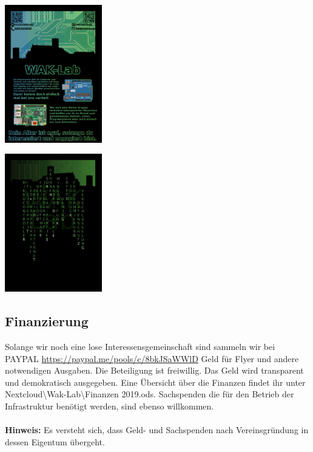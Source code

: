 \begin{minipage}[t]{0.5\textwidth}
  \centering
  \includegraphics[height=6cm]{pictures/FlyerMitPlatine.jpg}
  \label{img:FlyerMitPlatine}
\end{minipage}
\begin{minipage}[t]{0.5\textwidth}
  \centering
  \includegraphics[height=6cm]{pictures/FlyerRueckseite.jpg}
  \label{img:FlyerRueckseite}
\end{minipage}

\subsection{Finanzierung}
Solange wir noch eine lose Interessensgemeinschaft sind sammeln wir bei PAYPAL \url{https://paypal.me/pools/c/8bkJSaWWlD} Geld für Flyer und andere notwendigen Ausgaben. Die Beteiligung ist freiwillig. Das Geld wird transparent und demokratisch ausgegeben. Eine Übersicht über die Finanzen findet ihr unter Nextcloud\textbackslash Wak-Lab\textbackslash Finanzen 2019.ods. Sachspenden die für den Betrieb der Infrastruktur benötigt werden, sind ebenso willkommen. \\
\ \\
\textbf{Hinweis:} Es versteht sich, dass Geld- und Sachspenden nach Vereinsgründung in dessen Eigentum übergeht.\\

